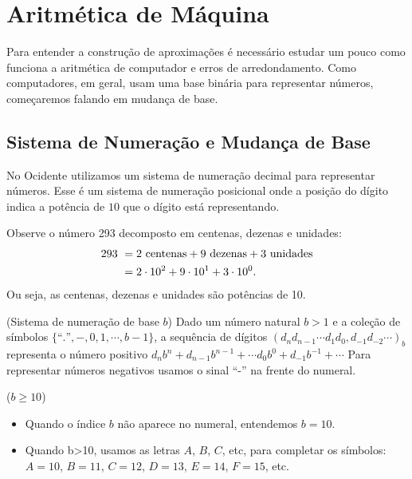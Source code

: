 \chapter{Aritmética de Máquina}
Para entender a construção de aproximações é necessário estudar um pouco como funciona a aritmética de computador e erros de arredondamento. Como computadores, em geral, usam uma base binária para representar números, começaremos falando em mudança de base.

\section{Sistema de Numeração e Mudança de Base}
No Ocidente utilizamos um sistema de numeração decimal para representar números. Esse é um sistema de numeração posicional onde a posição do dígito indica a potência de $10$ que o dígito está representando.

\begin{ex}
  Observe o número 293 decomposto em centenas, dezenas e unidades:
  \begin{align*}
    293\ &= 2\ \hbox{centenas}+9\ \hbox{dezenas}+3\ \hbox{unidades}\\
    &= 2\cdot 10^2+9\cdot 10^1+3\cdot 10^0.
  \end{align*}
  Ou seja, as centenas, dezenas e unidades são potências de 10.
\end{ex}

\begin{defn}(Sistema de numeração de base $b$)
Dado um número natural $b>1$ e  a coleção de símbolos $\{\text{``.''}, - ,0, 1, \cdots, b-1\}$, a sequência de dígitos
$
(d_nd_{n-1}\cdots d_1d_0,d_{-1}d_{-2}\cdots)_b
$
representa o número positivo
$
d_nb^n+d_{n-1}b^{n-1}+\cdots d_0b^0+d_{-1}b^{-1}+\cdots
$
Para representar números negativos usamos o sinal ``-'' na frente do numeral.
\end{defn}

\begin{obs}($b\geq 10$)

\begin{itemize}
\item Quando o índice $b$ não aparece no numeral, entendemos $b=10$.
\item Quando b>10, usamos as letras $A$, $B$, $C$, etc, para completar os símbolos: $A=10$, $B=11$, $C=12$, $D=13$, $E=14$, $F=15$, etc.
\end{itemize}
\end{obs}


